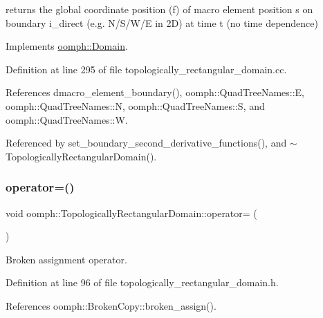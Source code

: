 returns the global coordinate position (f) of macro element position s on boundary i\+\_\+direct (e.\+g. N/\+S/\+W/E in 2D) at time t (no time dependence) 

Implements \hyperlink{classoomph_1_1Domain_a95f3e00d28ea37e6c4d3027bfac91096}{oomph\+::\+Domain}.



Definition at line 295 of file topologically\+\_\+rectangular\+\_\+domain.\+cc.



References dmacro\+\_\+element\+\_\+boundary(), oomph\+::\+Quad\+Tree\+Names\+::E, oomph\+::\+Quad\+Tree\+Names\+::N, oomph\+::\+Quad\+Tree\+Names\+::S, and oomph\+::\+Quad\+Tree\+Names\+::W.



Referenced by set\+\_\+boundary\+\_\+second\+\_\+derivative\+\_\+functions(), and $\sim$\+Topologically\+Rectangular\+Domain().

\mbox{\label{classoomph_1_1TopologicallyRectangularDomain_ab04f175b5baff51c457c51252880b1ff}} 
\subsubsection{\texorpdfstring{operator=()}{operator=()}}
{\footnotesize\ttfamily void oomph\+::\+Topologically\+Rectangular\+Domain\+::operator= (\begin{DoxyParamCaption}\item[{const \hyperlink{classoomph_1_1TopologicallyRectangularDomain}{Topologically\+Rectangular\+Domain} \&}]{ }\end{DoxyParamCaption})\hspace{0.3cm}{\ttfamily [inline]}}



Broken assignment operator. 



Definition at line 96 of file topologically\+\_\+rectangular\+\_\+domain.\+h.



References oomph\+::\+Broken\+Copy\+::broken\+\_\+assign().

\mbox{\label{classoomph_1_1TopologicallyRectangularDomain_a02ac630af43ddea871e5d9cf543d783b}} 
